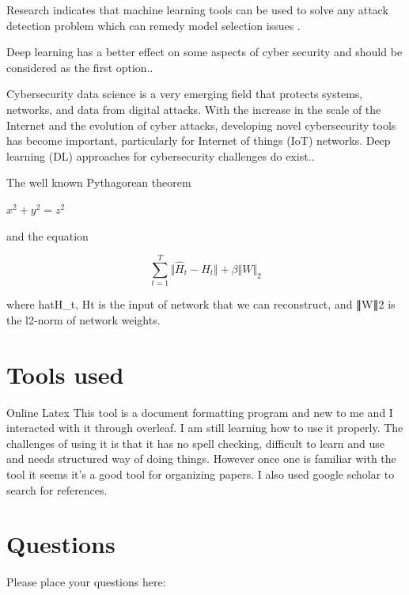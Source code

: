 \documentclass{article}
\begin{document}
Research indicates that machine learning tools can be used to solve any attack detection problem which can remedy model selection issues \cite{berghout2022machine}.

Deep learning has a better effect on some aspects of cyber security and should be considered as the first option.\cite{li2021deep}.

Cybersecurity data science is a very emerging field that protects systems, networks, and data from digital attacks. With the increase in the scale of the Internet and the evolution of cyber attacks, developing novel cybersecurity tools has become important, particularly for Internet of things (IoT) networks. Deep learning (DL) approaches for cybersecurity challenges do exist.\cite{podder2021artificial}.
\par
 \doublespacing
The well known Pythagorean theorem \par \(x^2 + y^2 = z^2\) \par and the equation \par
 \doublespacing
\begin{equation*} \sum _{t=1}^{T}\Vert {\hat{H}_t-H_t}\Vert +\beta \Vert W\Vert _2 \tag{11} \end{equation*}

where hat{H}_t, Ht  is the input of network that we can reconstruct, and ∥W∥2 is the l2-norm of network weights.

\nocite{jain2004introduction}
\nocite{yu2003ga}
\nocite{roy2018protection}
\nocite{zhang2021research}
\nocite{lecun2015deep}
\nocite{bai2021know}
\nocite{yu2021information}
\nocite{xu2018industry}
\nocite{culot2019addressing}
\nocite{meneghello2019iot}
\nocite{wang2019blockchain}
\nocite{falco2018iiot}
\nocite{pan2015classification}
\nocite{zhang2003data}
\nocite{demertzis2018next}
\nocite{hao2016mining}
\nocite{zhao2019blockchain}
\nocite{gurdgiev2021informational}
\nocite{jain2004introduction}
\nocite{podder2021artificial}

\medskip

\section{Tools used}
Online Latex
This tool is a document formatting program and new to me and I interacted with it through overleaf. I am still learning how to use it properly. The challenges of using it is that it has no spell checking, difficult to learn and use and  needs structured way of doing things. However once one is familiar with the tool it seems it's a good tool for organizing papers. I also used google scholar to search for references. 


\section{Questions}
Please place your questions here:

\printbibliography
\end{document}
